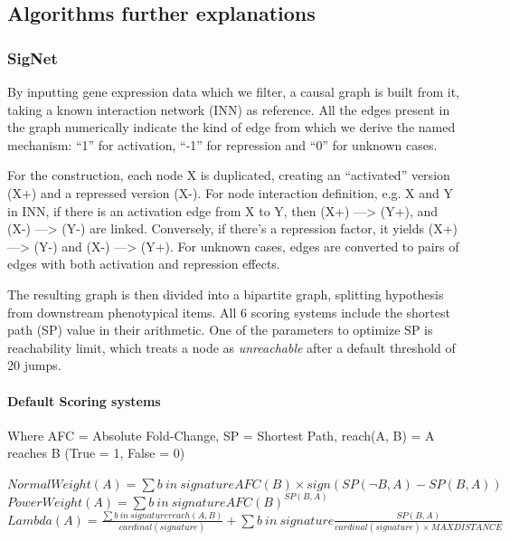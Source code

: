 \subsection{Algorithms further explanations}
\label{section:suppl:algorithms}

\subsubsection{SigNet}
\label{section:suppl:algorithms-signet}
By inputting gene expression data which we filter, a causal graph is built from it, taking a known interaction network (INN) as reference. All the edges present in the graph numerically indicate the kind of edge from which we derive the named mechanism: “1” for activation, “-1” for repression and “0” for unknown cases.

For the construction, each node X is duplicated, creating an “activated” version (X+) and a repressed version (X-). For node interaction definition, e.g. X and Y in INN, if there is an activation edge from X to Y, then (X+) —> (Y+), and (X-) —> (Y-) are linked. Conversely, if there’s a repression factor, it yields (X+) —> (Y-) and (X-) —> (Y+). For unknown cases, edges are converted to pairs of edges with both activation and repression effects.

The resulting graph is then divided into a bipartite graph, splitting hypothesis from downstream phenotypical items. All 6 scoring systems include the shortest path (SP) value in their arithmetic. One of the parameters to optimize SP is reachability limit, which treats a node as \textit{unreachable } after a default threshold of 20 jumps.

\paragraph{Default Scoring systems}
Where AFC = Absolute Fold-Change, SP = Shortest Path, reach(A, B) = A reaches B (True = 1, False = 0)

\begin{center}
    $NormalWeight(A) = \sum{b\ in\ signature} AFC(B) \times sign(SP(\neg B, A) - SP(B, A))$ \\    
    $PowerWeight(A) = \sum{b\ in\ signature} AFC(B)^{SP(B, A)}$ \\
    $Lambda(A) = \frac{\sum{b\ in\ signature} reach(A, B)}{cardinal(signature)} + \sum{b\ in\ signature} \frac{SP(B, A)}{cardinal(signature) \times MAXDISTANCE}$ \\
\end{center}